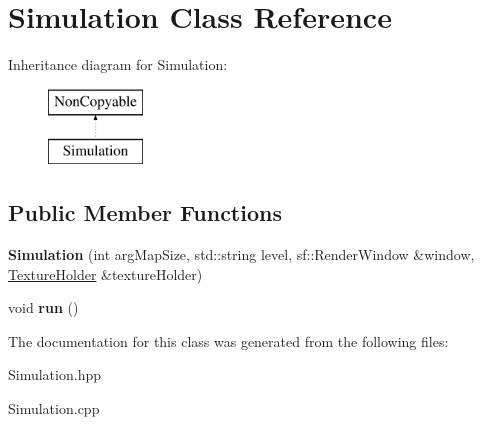 \hypertarget{class_simulation}{\section{Simulation Class Reference}
\label{class_simulation}
}
Inheritance diagram for Simulation\-:\begin{figure}[H]
\begin{center}
\leavevmode
\includegraphics[height=2.000000cm]{class_simulation}
\end{center}
\end{figure}
\subsection*{Public Member Functions}
\begin{DoxyCompactItemize}
\item 
\hypertarget{class_simulation_a18efa4acf8da95ff406d747f69a85542}{{\bfseries Simulation} (int arg\-Map\-Size, std\-::string level, sf\-::\-Render\-Window \&window, \hyperlink{class_texture_holder}{Texture\-Holder} \&texture\-Holder)}\label{class_simulation_a18efa4acf8da95ff406d747f69a85542}

\item 
\hypertarget{class_simulation_ae5c367f87c0b5dc9740bc6d00e44e72c}{void {\bfseries run} ()}\label{class_simulation_ae5c367f87c0b5dc9740bc6d00e44e72c}

\end{DoxyCompactItemize}


The documentation for this class was generated from the following files\-:\begin{DoxyCompactItemize}
\item 
Simulation.\-hpp\item 
Simulation.\-cpp\end{DoxyCompactItemize}
